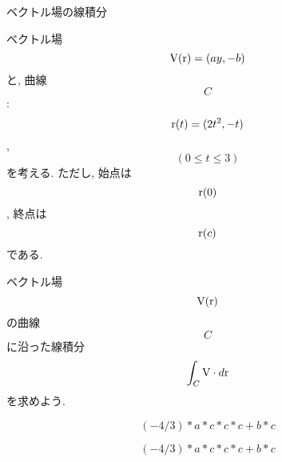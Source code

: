 \makeatletter  
{}%
\makeatother


 \begin{theme}{ベクトル場の線積分}
   \begin{memo}
   \end{memo}
  \begin{prob}
ベクトル場 $${\bf\mathrm{V}}({\bf\mathrm{r}})=({a}y,-{b})$$ と, 曲線 $$C$$: $${\bf\mathrm{r}}(t)=(2t^2,-t)$$, $$(0\leq t \leq 3)$$を考える. ただし, 始点は$${\bf\mathrm{r}}(0)$$, 終点は$${\bf\mathrm{r}}( {c} )$$である.

ベクトル場$${\bf\mathrm{V}}({\bf\mathrm{r}})$$の曲線$$C$$に沿った線積分 $$\int_C{\bf\mathrm{V}}\cdot d{\bf\mathrm{r}}$$ を求めよう.
  \end{prob}
  \begin{sol}
$$(-4/3)*{a}*{c}*{c}*{c}+{b}*{c}$$
    \end{sol}
  \begin{ans}
$$(-4/3)*{a}*{c}*{c}*{c}+{b}*{c}$$
    \end{ans}
\end{theme}




\makeatletter
{}
\makeatother

